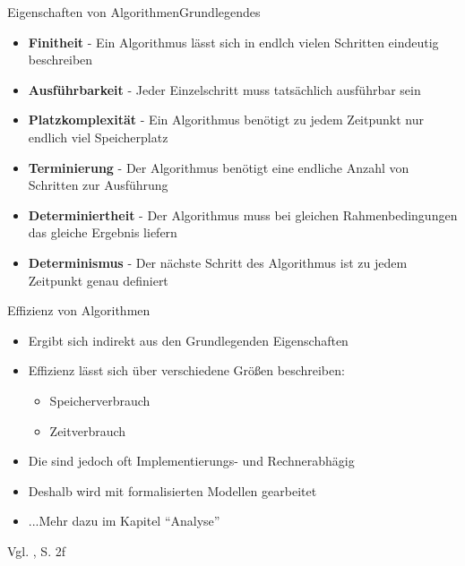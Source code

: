 
\begin{frame}{Eigenschaften von Algorithmen}{Grundlegendes}
    \begin{itemize}[<+->]
        \item \textbf{Finitheit} - Ein Algorithmus lässt sich in endlch vielen Schritten eindeutig beschreiben
        \item \textbf{Ausführbarkeit} - Jeder Einzelschritt muss tatsächlich ausführbar sein
        \item \textbf{Platzkomplexität} - Ein Algorithmus benötigt zu jedem Zeitpunkt nur endlich viel Speicherplatz
        \item \textbf{Terminierung} - Der Algorithmus benötigt eine endliche Anzahl von Schritten zur Ausführung
        \item \textbf{Determiniertheit} - Der Algorithmus muss bei gleichen Rahmenbedingungen das gleiche Ergebnis liefern
        \item \textbf{Determinismus} - Der nächste Schritt des Algorithmus ist zu jedem Zeitpunkt genau definiert
    \end{itemize}
\end{frame}

\begin{frame}{Effizienz von Algorithmen}{}
    \begin{itemize}
        \item Ergibt sich indirekt aus den Grundlegenden Eigenschaften
        \item Effizienz lässt sich über verschiedene Größen beschreiben:
        \begin{itemize}
            \item Speicherverbrauch
            \item Zeitverbrauch
        \end{itemize}
        \item Die sind jedoch oft Implementierungs- und Rechnerabhägig
        \item Deshalb wird mit formalisierten Modellen gearbeitet
        \item ...Mehr dazu im Kapitel "`Analyse"'
    \end{itemize}
    
    Vgl. \cite{ottmann2017}, S. 2f
\end{frame}


